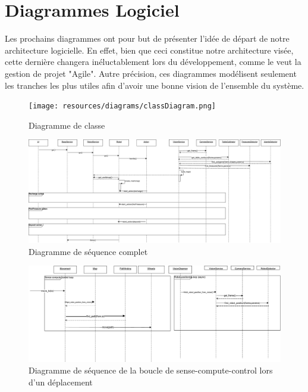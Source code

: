 \chapter{Diagrammes Logiciel}
Les prochains diagrammes ont pour but de présenter l'idée de départ de notre architecture logicielle.
En effet, bien que ceci constitue notre architecture visée, cette dernière changera inéluctablement lors du développement, comme le veut la gestion de projet "Agile".
Autre précision, ces diagrammes modélisent seulement les tranches les plus utiles afin d'avoir une bonne vision de l'ensemble du système.

\begin{landscape}
\begin{figure}
  \centering
  \texttt{[image: resources/diagrams/classDiagram.png]}
  \caption{Diagramme de classe}
\end{figure}

\begin{figure}
  \centering
  \includegraphics[scale=0.45, angle=0]{resources/diagrams/sequenceDiagram.pdf}
  \caption{Diagramme de séquence complet}
\end{figure}

\begin{figure}
  \centering
  \includegraphics[scale=0.45, angle=0]{resources/diagrams/robotMovement.pdf}
  \caption{Diagramme de séquence de la boucle de sense-compute-control lors d'un déplacement}
\end{figure}


\end{landscape}

